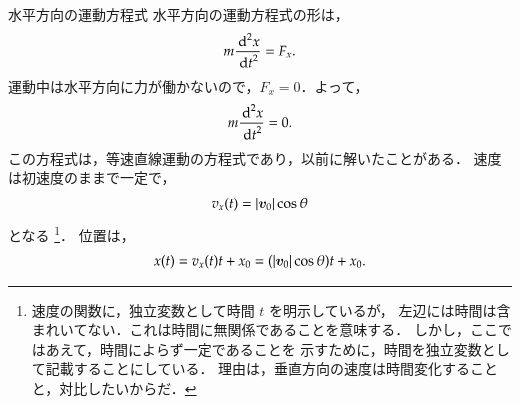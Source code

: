             \begin{mysmallsec}{水平方向の運動方程式}
            水平方向の運動方程式の形は，
                \begin{equation*}
                    m\frac{{\,\mathrm{d}}^{2} x}{{\,\mathrm{d} t}^{2}} = F_{x}.
                \end{equation*}
            運動中は水平方向に力が働かないので，$F_{x} = 0$．よって，
                \begin{align}
                    m\frac{{\,\mathrm{d}}^{2} x}{{\,\mathrm{d} t}^{2}} = 0.
                \end{align}
            この方程式は，等速直線運動の方程式であり，以前に解いたことがある．
            速度は初速度のままで一定で，
                \begin{align}
                    v_{x}(t) = |\boldsymbol{v}_{0}| \cos \theta
                \end{align}
            となる
                \footnote{
                    速度の関数に，独立変数として時間 $t$ を明示しているが，
                    左辺には時間は含まれいてない．これは時間に無関係であることを意味する．
                    しかし，ここではあえて，時間によらず一定であることを
                    示すために，時間を独立変数として記載することにしている．
                    理由は，垂直方向の速度は時間変化することと，対比したいからだ．
                }．
            位置は，
                \begin{align}
                    x(t) = v_{x}(t)t + x_{0} = (|\boldsymbol{v}_{0}| \cos \theta)t +  x_{0}.
                \end{align}
            \end{mysmallsec}


